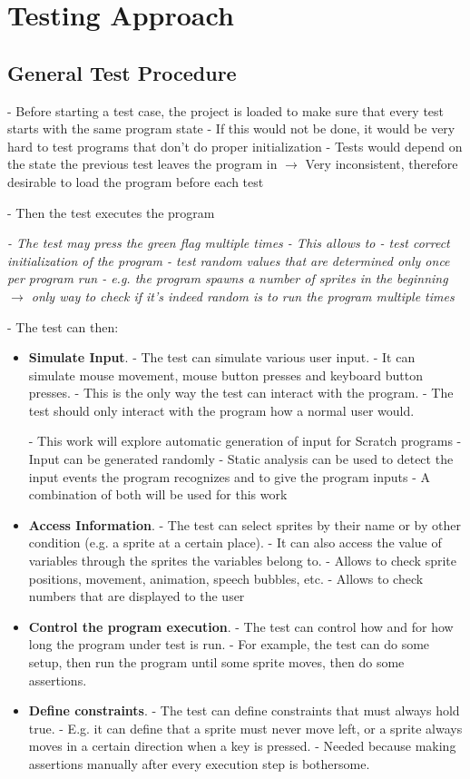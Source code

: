 \chapter{Testing Approach}

\section{General Test Procedure}

- Before starting a test case, the project is loaded to make sure that every test starts with the same program state
    - If this would not be done, it would be very hard to test programs that don't do proper initialization
    - Tests would depend on the state the previous test leaves the program in
    $\rightarrow$ Very inconsistent, therefore desirable to load the program before each test

- Then the test executes the program

\textit{- The test may press the green flag multiple times
- This allows to
    - test correct initialization of the program
    - test random values that are determined only once per program run
        - e.g. the program spawns a number of sprites in the beginning
        $\rightarrow$ only way to check if it's indeed random is to run the program multiple times
    }

\noindent- The test can then:
\begin{itemize}
    \item \textbf{Simulate Input}.
        - The test can simulate various user input.
        - It can simulate mouse movement, mouse button presses and keyboard button presses.
        - This is the only way the test can interact with the program.
        - The test should only interact with the program how a normal user would.

        - This work will explore automatic generation of input for Scratch programs
        - Input can be generated randomly
        - Static analysis can be used to detect the input events the program recognizes and to give the program inputs
        - A combination of both will be used for this work
    \item \textbf{Access Information}.
        - The test can select sprites by their name or by other condition (e.g. a sprite at a certain place).
        - It can also access the value of variables through the sprites the variables belong to.
        - Allows to check sprite positions, movement, animation, speech bubbles, etc.
        - Allows to check numbers that are displayed to the user
    \item \textbf{Control the program execution}.
        - The test can control how and for how long the program under test is run.
        - For example, the test can do some setup, then run the program until some sprite moves, then do some assertions.
    \item \textbf{Define constraints}.
        - The test can define constraints that must always hold true.
        - E.g. it can define that a sprite must never move left, or a sprite always moves in a certain direction when a key is pressed.
        - Needed because making assertions manually after every execution step is bothersome.
\end{itemize}


